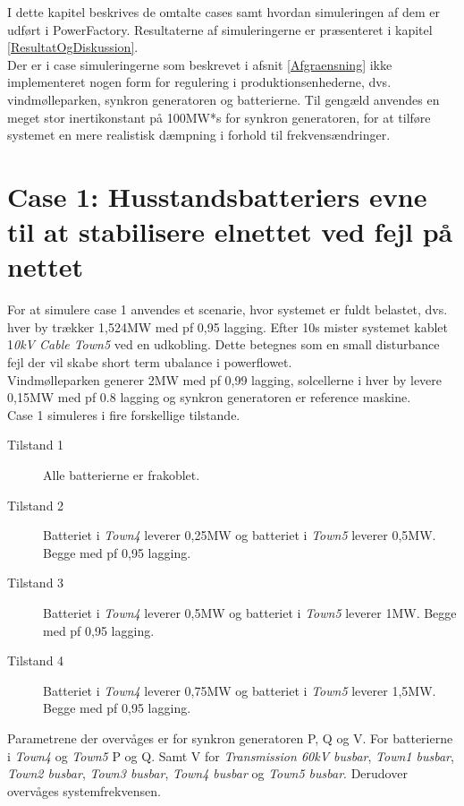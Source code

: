 
\label{Simulering}
I dette kapitel beskrives de omtalte cases samt hvordan simuleringen af dem er udført i PowerFactory. Resultaterne af simuleringerne er præsenteret i kapitel \ref{ResultatOgDiskussion}.\\
Der er i case simuleringerne som beskrevet i afsnit \ref{Afgraensning} ikke implementeret nogen form for regulering i produktionsenhederne, dvs. vindmølleparken, synkron generatoren og batterierne. Til gengæld anvendes en meget stor inertikonstant på 100MW*s for synkron generatoren, for at tilføre systemet en mere realistisk dæmpning i forhold til frekvensændringer.

\section{Case 1: Husstandsbatteriers evne til at stabilisere elnettet ved fejl på nettet}
\label{SimCase1}
For at simulere case 1 anvendes et scenarie, hvor systemet er fuldt belastet, dvs. hver by trækker 1,524MW med pf 0,95 lagging. Efter 10s mister systemet kablet 1\textit{0kV Cable Town5} ved en udkobling. Dette betegnes som en small disturbance fejl der vil skabe short term ubalance i powerflowet.\\
Vindmølleparken generer 2MW med pf 0,99 lagging, solcellerne i hver by levere 0,15MW med pf 0.8 lagging og synkron generatoren er reference maskine.\\
Case 1 simuleres i fire forskellige tilstande.

\begin{description}
	\item[Tilstand 1] Alle batterierne er frakoblet.
	\item[Tilstand 2] Batteriet i \textit{Town4} leverer 0,25MW og batteriet i \textit{Town5} leverer 0,5MW. Begge med pf 0,95 lagging.
	\item[Tilstand 3] Batteriet i \textit{Town4} leverer 0,5MW og batteriet i \textit{Town5} leverer 1MW. Begge med pf 0,95 lagging.
	\item[Tilstand 4] Batteriet i \textit{Town4} leverer 0,75MW og batteriet i \textit{Town5} leverer 1,5MW. Begge med pf 0,95 lagging.
\end{description}

Parametrene der overvåges er for synkron generatoren P, Q og V.
For batterierne i \textit{Town4} og \textit{Town5} P og Q. Samt V for \textit{Transmission 60kV busbar}, \textit{Town1 busbar}, \textit{Town2 busbar}, \textit{Town3 busbar}, \textit{Town4 busbar} og \textit{Town5 busbar}.
Derudover overvåges systemfrekvensen.

